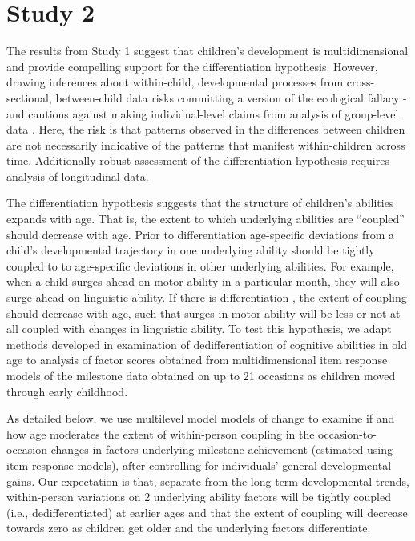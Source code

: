 \documentclass[man, floatsintext]{apa7}
\begin{document}
\section{Study 2}


The results from Study 1 suggest that children's development is multidimensional and provide compelling support for the differentiation hypothesis. However, drawing inferences about within-child, developmental processes from cross-sectional, between-child data risks committing a version of the ecological fallacy - and cautions against making individual-level claims from analysis of group-level data \parencite{piantadosi1988}. Here, the risk is that patterns observed in the differences between children are not necessarily indicative of the patterns that manifest within-children across time. Additionally robust assessment of the differentiation hypothesis requires analysis of longitudinal data.

The differentiation hypothesis suggests that the structure of children's
abilities expands with age. That is, the extent to which underlying abilities are ``coupled'' should decrease with age. Prior to differentiation age-specific deviations from a child's developmental trajectory in one underlying ability should be tightly coupled to to age-specific deviations in other underlying abilities. For example, when a child surges ahead on motor ability in a particular month, they will also surge ahead on linguistic ability. If there is differentiation , the extent of coupling should decrease with age, such that surges in motor ability will be less or not at all coupled with changes in linguistic ability. To test this hypothesis, we adapt methods developed in
examination of dedifferentiation of cognitive abilities in old age \parencite{hulur2015}
to analysis of factor scores obtained from multidimensional item
response models of the milestone data obtained on up to 21 occasions as
children moved through early childhood.

As detailed below, we use multilevel model models of change to examine if and how age moderates
the extent of within-person coupling in the occasion-to-occasion changes
in factors underlying milestone achievement (estimated using item
response models), after controlling for individuals' general
developmental gains. Our expectation is that, separate from the
long-term developmental trends, within-person variations on 2 underlying
ability factors will be tightly coupled (i.e., dedifferentiated) at
earlier ages and that the extent of coupling will decrease towards zero
as children get older and the underlying factors differentiate.
\end{document}
